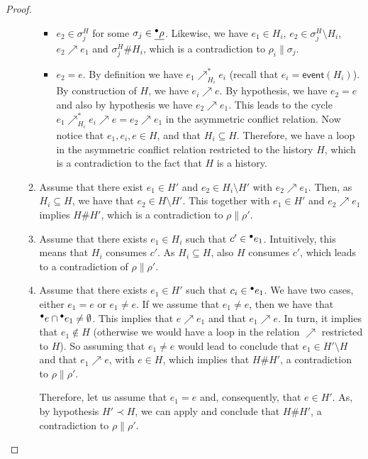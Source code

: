 \documentclass{article}
\newcommand{\event}[1]{\ensuremath{\mathsf{event}(#1)}}
\newcommand{\confl}{\ensuremath{\mathord{\#}}}
\begin{document}
\begin{proof}
\begin{enumerate}[(a)]
\begin{enumerate}[1.]
\begin{itemize}
\item $e_2 \in \sigma^H_j$ for some $\sigma_j \in \underline{{}^\bullet\rho}$.  Likewise,
we have $e_1 \in H_i$, $e_2 \in \sigma^H_j \setminus H_i$, $e_2 \nearrow e_1$
and $\sigma^H_j \confl H_i$, which is a contradiction to $\rho_i \parallel
\sigma_j$.

\item $e_2 = e$.  By definition  we have $e_1 \nearrow^*_{H_i}
e_i$ (recall that $e_i = \event{H_i}$).  By construction of $H$, we have $e_i
\nearrow e$.  By hypothesis, we have $e_2 = e$ and also by hypothesis we have
$e_2 \nearrow e_1$.  This leads to the cycle $e_1 \nearrow^*_{H_i} e_i \nearrow
e = e_2 \nearrow e_1$ in the asymmetric conflict relation.  Now notice that
$e_1, e_i, e \in H$, and that $H_i \subseteq H$.  Therefore, we have a loop in
the asymmetric conflict relation restricted to the history $H$, which is a
contradiction to the fact that $H$ is a history.
\end{itemize}

\item Assume that there exist $e_1 \in H'$ and $e_2 \in H_i \setminus H'$ with
$e_2 \nearrow e_1$.  Then, as $H_i \subseteq H$, we have that $e_2 \in H
\setminus H'$.  This together with $e_1 \in H'$ and $e_2 \nearrow e_1$ implies
$H \confl H'$, which is a contradiction to $\rho \parallel \rho'$.

\item Assume that there exists $e_1 \in H_i$ such that $c' \in {}^\bullet e_1$.
Intuitively, this means that $H_i$ consumes $c'$.  As $H_i \subseteq H$, also
$H$ consumes $c'$, which leads to a contradiction of $\rho \parallel \rho'$.

\item Assume that there exists $e_1 \in H'$ such that $c_i \in {}^\bullet e_1$.  We
have two cases, either $e_1 = e$ or $e_1 \not= e$.  If we assume that $e_1
\not= e$, then we have that ${}^\bullet e \cap {}^\bullet e_1 \not= \emptyset$.  This
implies that $e \nearrow e_1$ and that $e_1 \nearrow e$.  In turn, it implies
that $e_1 \notin H$ (otherwise we would have a loop in the relation $\nearrow$
restricted to $H$).  So assuming that $e_1 \not= e$ would lead to conclude that
$e_1 \in H' \setminus H$ and that $e_1 \nearrow e$, with $e \in H$, which
implies that $H \confl H'$, a contradiction to $\rho \parallel \rho'$.

Therefore, let us assume that $e_1 = e$ and, consequently, that $e \in H'$.
As, by hypothesis $H' \prec H$, we can apply  and conclude
that $H \confl H'$, a contradiction to $\rho \parallel \rho'$.
\end{enumerate}


\end{enumerate}
\end{proof}
\end{document}
